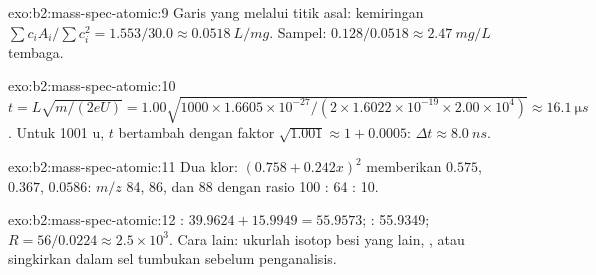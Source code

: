 \begin{solution}{exo:b2:mass-spec-atomic:9}
Garis yang melalui titik asal: kemiringan $\sum c_iA_i/\sum c_i^2 = 1.553/30.0 \approx \qty{0.0518}{L/mg}$. Sampel:
$0.128/0.0518 \approx \qty{2.47}{mg/L}$ tembaga.
\end{solution}

\begin{solution}{exo:b2:mass-spec-atomic:10}
$t = L\sqrt{m/(2eU)} = 1.00\sqrt{1000 \times 1.6605 \times 10^{-27}/(2 \times 1.6022 \times 10^{-19}
\times 2.00 \times 10^4)} \approx \qty{16.1}{\micro s}$. Untuk 1001 u, $t$ bertambah dengan faktor
$\sqrt{1.001} \approx 1 + 0.0005$: $\Delta t \approx \qty{8.0}{ns}$.
\end{solution}

\begin{solution}{exo:b2:mass-spec-atomic:11}
Dua klor: $(0.758 + 0.242x)^2$ memberikan $0.575$, $0.367$, $0.0586$: $m/z$
84, 86, dan 88 dengan rasio
100 : 64 : 10.
\end{solution}

\begin{solution}{exo:b2:mass-spec-atomic:12}
: $39.9624 + 15.9949 = 55.9573$; : 55.9349; $R = 56/0.0224 \approx 2.5 \times
10^3$. Cara lain: ukurlah isotop besi yang lain, , atau
singkirkan  dalam sel tumbukan sebelum penganalisis.
\end{solution}


